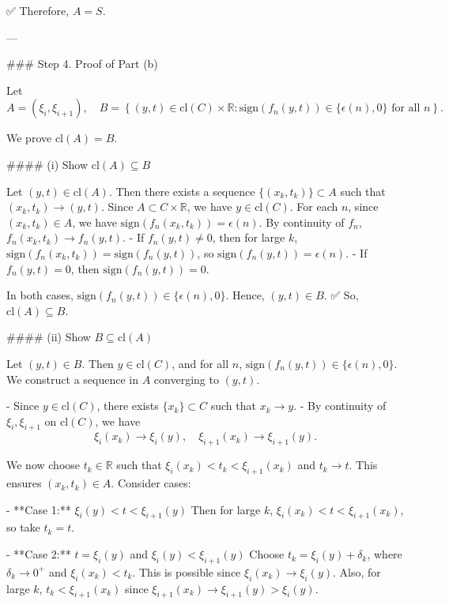 \documentclass[12pt]{article}
\theoremstyle{mythm}
\let\oldendproof\endproof
\renewenvironment{proof}[1][\proofname]{%
  \oldproof[\normalfont \bfseries \sffamily #1]%
}{\oldendproof}
\renewcommand*{\proofname}{Proof}
\renewcommand*{\proofname}{Proof}
\renewcommand*{\proofname}{Proof}
\renewcommand*{\proofname}{Proof}
\renewcommand*{\proofname}{Proof}
\renewcommand*{\proofname}{Proof}
\renewcommand*{\proofname}{Proof}
\begin{document}
\begin{proof}
✅ Therefore, \( A = S \).

---

### Step 4. Proof of Part (b)

Let  
\[
A = (\xi_i, \xi_{i+1}), \quad B = \left\{ (y, t) \in \mathrm{cl}(C) \times \mathbb{R} : \mathrm{sign}(f_n(y, t)) \in \{\epsilon(n), 0\} \text{ for all } n \right\}.
\]

We prove \( \mathrm{cl}(A) = B \).

#### (i) Show \( \mathrm{cl}(A) \subseteq B \)

Let \( (y, t) \in \mathrm{cl}(A) \). Then there exists a sequence \( \{(x_k, t_k)\} \subset A \) such that \( (x_k, t_k) \to (y, t) \).  
Since \( A \subset C \times \mathbb{R} \), we have \( y \in \mathrm{cl}(C) \).  
For each \( n \), since \( (x_k, t_k) \in A \), we have \( \mathrm{sign}(f_n(x_k, t_k)) = \epsilon(n) \).  
By continuity of \( f_n \), \( f_n(x_k, t_k) \to f_n(y, t) \).  
- If \( f_n(y, t) \ne 0 \), then for large \( k \), \( \mathrm{sign}(f_n(x_k, t_k)) = \mathrm{sign}(f_n(y, t)) \), so \( \mathrm{sign}(f_n(y, t)) = \epsilon(n) \).  
- If \( f_n(y, t) = 0 \), then \( \mathrm{sign}(f_n(y, t)) = 0 \).  

In both cases, \( \mathrm{sign}(f_n(y, t)) \in \{\epsilon(n), 0\} \). Hence, \( (y, t) \in B \).  
✅ So, \( \mathrm{cl}(A) \subseteq B \).

#### (ii) Show \( B \subseteq \mathrm{cl}(A) \)

Let \( (y, t) \in B \). Then \( y \in \mathrm{cl}(C) \), and for all \( n \), \( \mathrm{sign}(f_n(y, t)) \in \{\epsilon(n), 0\} \).  
We construct a sequence in \( A \) converging to \( (y, t) \).

- Since \( y \in \mathrm{cl}(C) \), there exists \( \{x_k\} \subset C \) such that \( x_k \to y \).  
- By continuity of \( \xi_i, \xi_{i+1} \) on \( \mathrm{cl}(C) \), we have  
  \[
  \xi_i(x_k) \to \xi_i(y), \quad \xi_{i+1}(x_k) \to \xi_{i+1}(y).
  \]

We now choose \( t_k \in \mathbb{R} \) such that \( \xi_i(x_k) < t_k < \xi_{i+1}(x_k) \) and \( t_k \to t \).  
This ensures \( (x_k, t_k) \in A \). Consider cases:

- **Case 1:** \( \xi_i(y) < t < \xi_{i+1}(y) \)  
  Then for large \( k \), \( \xi_i(x_k) < t < \xi_{i+1}(x_k) \), so take \( t_k = t \).

- **Case 2:** \( t = \xi_i(y) \) and \( \xi_i(y) < \xi_{i+1}(y) \)  
  Choose \( t_k = \xi_i(y) + \delta_k \), where \( \delta_k \to 0^+ \) and \( \xi_i(x_k) < t_k \).  
  This is possible since \( \xi_i(x_k) \to \xi_i(y) \).  
  Also, for large \( k \), \( t_k < \xi_{i+1}(x_k) \) since \( \xi_{i+1}(x_k) \to \xi_{i+1}(y) > \xi_i(y) \).


\end{proof}
\end{document}
